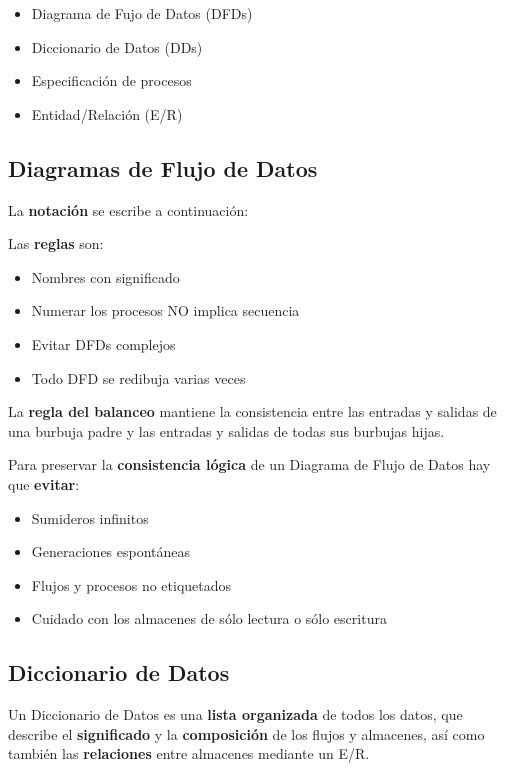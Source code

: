 \begin{itemize}[noitemsep]
\item Diagrama de Fujo de Datos (DFDs)
\item Diccionario de Datos (DDs)
\item Especificación de procesos
\item Entidad/Relación (E/R)
\end{itemize}

\subsection{Diagramas de Flujo de Datos} %
La \textbf{notación} se escribe a continuación:


Las \textbf{reglas} son:

\begin{itemize}[noitemsep]
\item Nombres con significado
\item Numerar los procesos NO implica secuencia
\item Evitar DFDs complejos
\item Todo DFD se redibuja varias veces
\end{itemize}

La \textbf{regla del balanceo} mantiene la consistencia entre las entradas y salidas de una burbuja padre y las entradas y salidas de todas sus burbujas hijas.

Para preservar la \textbf{consistencia lógica} de un Diagrama de Flujo de Datos hay que \textbf{evitar}:

\begin{itemize}[noitemsep]
\item Sumideros infinitos
\item Generaciones espontáneas
\item Flujos y procesos no etiquetados
\item Cuidado con los almacenes de sólo lectura o sólo escritura
\end{itemize}


\subsection{Diccionario de Datos} %
Un Diccionario de Datos es una \textbf{lista organizada} de todos los datos, que describe el \textbf{significado} y la \textbf{composición} de los flujos y almacenes, así como también las \textbf{relaciones} entre almacenes mediante un E/R.


